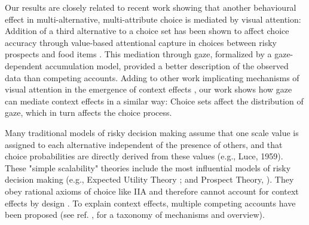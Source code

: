 \documentclass[11pt, a4paper]{article}
\begin{document}
Our results are closely related to recent work showing that another behavioural effect in multi-alternative, multi-attribute choice is mediated by visual attention: Addition of a third alternative to a choice set has been shown to affect choice accuracy through value-based attentional capture in choices between risky prospects \autocite{gluth2018ValuebasedAttentionalCapture} and food items \autocite{gluth2020ValuebasedAttentionNot}. This mediation through gaze, formalized by a gaze-dependent accumulation model, provided a better description of the observed data than competing accounts. Adding to other work implicating mechanisms of visual attention in the emergence of context effects \autocite{cataldo2019ComparisonProcessAccount,evans2021ImpactPresentationOrder}, our work shows how gaze can mediate context effects in a similar way: Choice sets affect the distribution of gaze, which in turn affects the choice process.

Many traditional models of risky decision making assume that one scale value is assigned to each alternative independent of the presence of others, and that choice probabilities are directly derived from these values (e.g., Luce, 1959). These "simple scalability" theories include the most influential models of risky decision making (e.g., Expected Utility Theory \autocite{vonneumann1947TheoryGamesEconomic}; and Prospect Theory, \autocite{kahneman1979ProspectTheoryAnalysis}). They obey rational axioms of choice like IIA and therefore cannot account for context effects by design \autocite{rieskamp2006ExtendingBoundsRationality}. To explain context effects, multiple competing accounts have been proposed \autocite{bhatia2013AssociationsAccumulationPreference,noguchi2018MultialternativeDecisionSampling,roe2001MultialternativeDecisionField,soltani2012RangeNormalizationModelContextDependent,trueblood2014MultiattributeLinearBallistic,usher2004LossAversionInhibition,wollschlager20122NaryChoiceTree,tsetsos2012SalienceDrivenValue} (see ref. \autocite{turner2018CompetingTheoriesMultialternative}, for a taxonomy of mechanisms and overview). 
\end{document}
